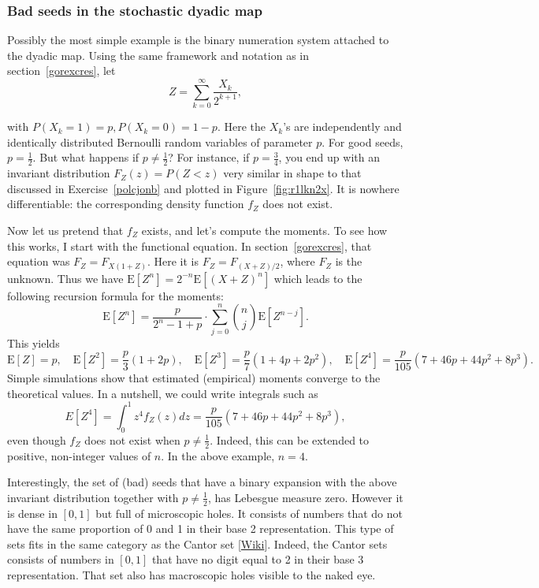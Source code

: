 \documentclass[oneside,10pt]{book}
\begin{document}
\subsubsection{Bad seeds in the stochastic dyadic map}

Possibly the most simple example is the binary numeration system attached to the 
 \textcolor{index}{dyadic map}. Using the same framework and notation as in section~\ref{gorexcres}, let
$$Z =\sum_{k=0}^\infty \frac{X_k}{2^{k+1}},$$ 

\noindent with  $P(X_k=1) = p, P(X_k=0) = 1-p .$
Here the $X_k$'s are independently and identically distributed Bernoulli random variables of parameter $p$. For good seeds,
 $p=\frac{1}{2}$. But what happens if $p\neq \frac{1}{2}$? For instance, if $p=\frac{3}{4}$, you end up with an invariant distribution 
 $F_Z(z) = P(Z<z)$ very similar in shape to 
 that discussed in Exercise~\ref{polcjonb} and plotted in Figure~\ref{fig:r1lkn2x}.
 It is nowhere differentiable: the corresponding density function $f_Z$ does not exist.

Now let us pretend that $f_Z$ exists, and let's compute the moments.
To see how this works, I start with the 
\textcolor{index}{functional equation}.  In section~\ref{gorexcres}, that equation
 was $F_Z=F_{X(1+Z)}$. Here it is  $F_Z=F_{(X+Z)/2}$, where $F_Z$ is the unknown. Thus we have $\text{E}[Z^n] = 2^{-n} \text{E}[(X+Z)^n]$ which leads to the following recursion formula for the moments:
$$\text{E}[Z^n]=\frac{p}{2^n-1 + p} 
\cdot\sum_{j=0}^{n} \binom{n}{j}\text{E}[Z^{n-j}].$$
This yields
$$\text{E}[Z] = p, \quad
\text{E}[Z^2] = \frac{p}{3}(1+2p), \quad
\text{E}[Z^3] = \frac{p}{7}(1+4p+2p^2),\quad
\text{E}[Z^4] = \frac{p}{105}(7+46p + 44p^2+8p^3).
$$
Simple simulations show that estimated (empirical) moments converge to the  theoretical values. In a nutshell, we could write integrals such 
 as 
$$
E[Z^4] = \int_0^1 z^4 f_Z(z) dz = \frac{p}{105}(7+46p + 44p^2+8p^3),
$$
even though $f_Z$ does not exist when $p\neq\frac{1}{2}$. Indeed, this can be extended to positive, non-integer values of $n$. In the 
 above example, $n=4$.

Interestingly, the set of (bad) seeds that have a binary expansion with the above invariant distribution together with $p\neq \frac{1}{2}$,
 has Lebesgue measure zero. However it is dense in $[0, 1]$ but full of microscopic holes. It consists of numbers that do not have the same 
 proportion of 0 and 1 in their base 2 representation. This type of sets fits in the
 same category as the \textcolor{index}{Cantor set} [\href{https://en.wikipedia.org/wiki/Cantor_set}{Wiki}].
 Indeed, the Cantor sets consists of numbers in $[0, 1]$ that have no digit equal to 2 in their base 3 representation. That set
 also has macroscopic holes visible to the naked eye.
\end{document}
